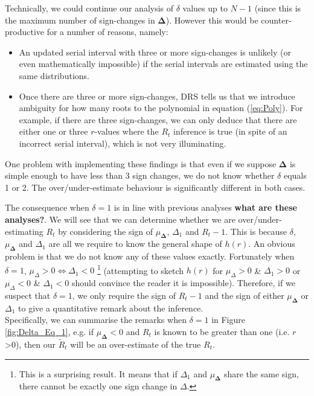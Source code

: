 \documentclass[10pt,journal,compsoc]{IEEEtran}
\begin{document}
Technically, we could continue our analysis of $\delta$ values up to $N-1$ (since this is the maximum number of sign-changes in $\boldsymbol{\Delta}$). However this would be counter-productive for a number of reasons, namely:

\begin{itemize}
    \item An updated serial interval with three or more sign-changes is unlikely (or even mathematically impossible) if the serial intervals are estimated using the same distributions.
    \item Once there are three or more sign-changes, DRS tells us that we introduce ambiguity for how many roots to the polynomial in equation (\ref{eq:Poly}). For example, if there are three sign-changes, we can only deduce that there are either one or three $r$-values where the $R_t$ inference is true (in spite of an incorrect serial interval), which is not very illuminating.
\end{itemize}

One problem with implementing these findings is that even if we suppose $\boldsymbol{\Delta}$ is simple enough to have less than 3 sign changes, we do not know whether $\delta$ equals 1 or 2. The over/under-estimate behaviour is significantly different in both cases.

The consequence when $\delta=1$ is in line with previous analyses \textbf{what are these analyses?}. We will see that we can determine whether we are over/under-estimating $R_t$ by considering the sign of  $\mu_{\boldsymbol{\Delta}}$, $\Delta_1$ and $R_t-1 $. This is because $\delta$, $\mu_{\boldsymbol{\Delta}}$ and $\Delta_1$ are all we require to know the general shape of $h(r)$. An obvious problem is that we do not know any of these values exactly. Fortunately when $\delta=1$, $\mu_{\Delta}>0 \iff \Delta_1 <0$ \footnote{This is a surprising result. It means that if $\Delta_1$ and $\mu_{\boldsymbol{\Delta}}$ share the same sign, there cannot be exactly one sign change in $\Delta$.} (attempting to sketch $h(r)$ for $\mu_{\Delta}>0$ \& $\Delta_1>0$ or $\mu_{\Delta}<0$ \& $\Delta_1<0$ should convince the reader it is impossible). Therefore, if we suspect that $\delta=1$, we only require the sign of $R_t-1$ and the sign of either $\mu_\boldsymbol{\Delta}$ or $\Delta_1$ to give a quantitative remark about the inference.\\

Specifically, we can summarise the remarks when $\delta=1$ in Figure \ref{fig:Delta_Eq_1}, e.g. if $\mu_{\boldsymbol{\Delta}}<0$ and $R_t$ is known to be greater than one (i.e. $r$>0), then our $\tilde{R}_t$ will be an over-estimate of the true $R_t$.
\end{document}
